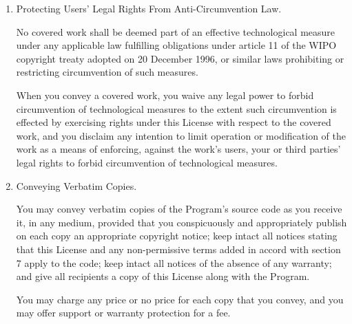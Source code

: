 \begin{enumerate}
You may make, run and propagate covered works that you do not
convey, without conditions so long as your license otherwise remains
in force.  You may convey covered works to others for the sole purpose
of having them make modifications exclusively for you, or provide you
with facilities for running those works, provided that you comply with
the terms of this License in conveying all material for which you do
not control copyright.  Those thus making or running the covered works
for you must do so exclusively on your behalf, under your direction
and control, on terms that prohibit them from making any copies of
your copyrighted material outside their relationship with you.

Conveying under any other circumstances is permitted solely under
the conditions stated below.  Sublicensing is not allowed; section 10
makes it unnecessary.

\item Protecting Users' Legal Rights From Anti-Circumvention Law.

No covered work shall be deemed part of an effective technological
measure under any applicable law fulfilling obligations under article
11 of the WIPO copyright treaty adopted on 20 December 1996, or
similar laws prohibiting or restricting circumvention of such
measures.

When you convey a covered work, you waive any legal power to forbid
circumvention of technological measures to the extent such circumvention
is effected by exercising rights under this License with respect to
the covered work, and you disclaim any intention to limit operation or
modification of the work as a means of enforcing, against the work's
users, your or third parties' legal rights to forbid circumvention of
technological measures.

\item Conveying Verbatim Copies.

You may convey verbatim copies of the Program's source code as you
receive it, in any medium, provided that you conspicuously and
appropriately publish on each copy an appropriate copyright notice;
keep intact all notices stating that this License and any
non-permissive terms added in accord with section 7 apply to the code;
keep intact all notices of the absence of any warranty; and give all
recipients a copy of this License along with the Program.

You may charge any price or no price for each copy that you convey,
and you may offer support or warranty protection for a fee.


\end{enumerate}
